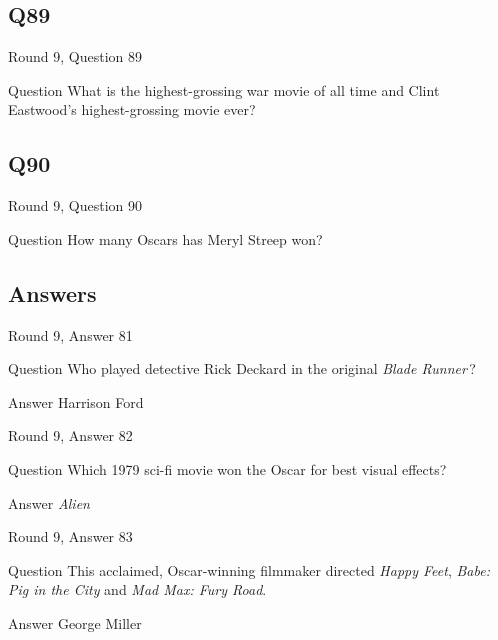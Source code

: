 \documentclass[11pt]{beamer}
\begin{document}
\subsection*{Q89}
\begin{frame}[t]{Round 9, Question 89}
\vspace{2em}
\begin{block}{Question}
What is the highest-grossing war movie of all time and Clint Eastwood's highest-grossing movie ever?
\end{block}
\end{frame}
    

\subsection*{Q90}
\begin{frame}[t]{Round 9, Question 90}
\vspace{2em}
\begin{block}{Question}
How many Oscars has Meryl Streep won?
\end{block}
\end{frame}
    
\subsection{Answers}

\begin{frame}[t]{Round 9, Answer 81}
\vspace{2em}
\begin{block}{Question}
Who played detective Rick Deckard in the original \emph{Blade Runner}\,?
\end{block}
\pause{}
\begin{block}{Answer}
Harrison Ford
\end{block}
\end{frame}
    

\begin{frame}[t]{Round 9, Answer 82}
\vspace{2em}
\begin{block}{Question}
Which 1979 sci-fi movie won the Oscar for best visual effects?
\end{block}
\pause{}
\begin{block}{Answer}
\emph{Alien}
\end{block}
\end{frame}
    

\begin{frame}[t]{Round 9, Answer 83}
\vspace{2em}
\begin{block}{Question}
This acclaimed, Oscar-winning filmmaker directed \emph{Happy Feet}, \emph{Babe: Pig in the City} and \emph{Mad Max: Fury Road}.
\end{block}
\pause{}
\begin{block}{Answer}
George Miller
\end{block}
\end{frame}
    
\end{document}
